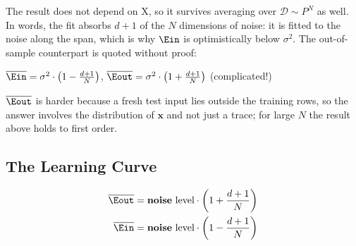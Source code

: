 The result does not depend on \(\mathrm{X}\), so it survives averaging over
\(\mathcal{D} \sim P^N\) as well. In words, the fit absorbs \(d + 1\) of the
\(N\) dimensions of noise: it is fitted to the noise along the span, which is
why \(\Ein\) is optimistically below \(\sigma^2\). The out-of-sample
counterpart is quoted without proof:

\begin{moral}
    \(\overline{\Ein} = \sigma^2 \cdot \left( 1 - \frac{d+1}{N} \right)\),
    \qquad \(\overline{\Eout} = \sigma^2 \cdot \left( 1 + \frac{d+1}{N}
    \right)\) (complicated!)
\end{moral}

\(\overline{\Eout}\) is harder because a fresh test input lies outside the
training rows, so the answer involves the distribution of \(\bm{x}\) and not
just a trace; for large \(N\) the result above holds to first order.

\subsection{The Learning Curve}\label{sec:learning-curve}

\begin{center}
    \begin{minipage}[c]{0.4\textwidth}
        \[
            \begin{aligned}
                \overline{\Eout} &= \textbf{noise} \text{ level} \cdot \left( 1
                + \frac{d+1}{N} \right)\\
                \overline{\Ein} &= \textbf{noise} \text{ level} \cdot \left( 1
                - \frac{d+1}{N} \right)
            \end{aligned}
        \]
    \end{minipage}%
    \begin{minipage}[c]{0.56\textwidth}
        \centering
    \end{minipage}
\end{center}


